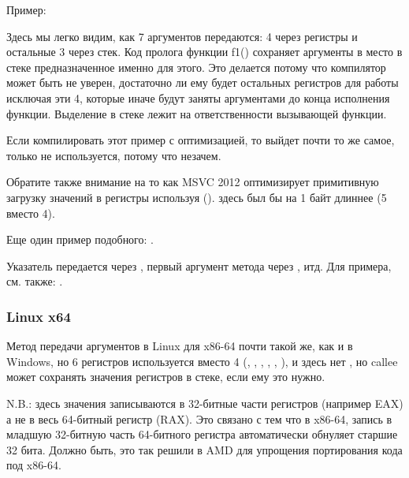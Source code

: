 Пример:





Здесь мы легко видим, как 7 аргументов передаются: 4 через регистры и остальные 3 через стек.
Код пролога функции f1() сохраняет аргументы в \EMDASH{}место в стеке предназначенное
именно для этого.
Это делается потому что компилятор может быть не уверен, достаточно ли ему будет остальных регистров
для работы исключая эти 4, которые иначе будут заняты аргументами до конца исполнения функции.
Выделение  в стеке лежит на ответственности вызывающей функции.



Если компилировать этот пример с оптимизацией, то выйдет почти то же самое, 
только  не используется, потому что незачем.

\label{using_MOV_and_pack_of_LEA_to_load_values}
Обратите также внимание на то как MSVC 2012 оптимизирует примитивную загрузку значений в регистры
используя \LEA ().
 здесь был бы на 1 байт длиннее (5 вместо 4).

Еще один пример подобного: .


Указатель \ITthis передается через \RCX, первый аргумент метода через \RDX, итд.
Для примера, см. также: .
 
\subsubsection{Linux x64}

Метод передачи аргументов в Linux для x86-64 почти такой же, как и в Windows, но 6 регистров
используется вместо 4 (\RDI, \RSI, \RDX, \RCX, , ), и здесь нет , 
но \gls{callee} может сохранять значения регистров в стеке, если ему это нужно.



N.B.: здесь значения записываются в 32-битные части регистров (например EAX) а не в весь 64-битный
регистр (RAX).
Это связано с тем что в x86-64,
запись в младшую 32-битную часть 64-битного регистра автоматически обнуляет старшие 32 бита.
Должно быть, это так решили в AMD для упрощения портирования кода под x86-64.

